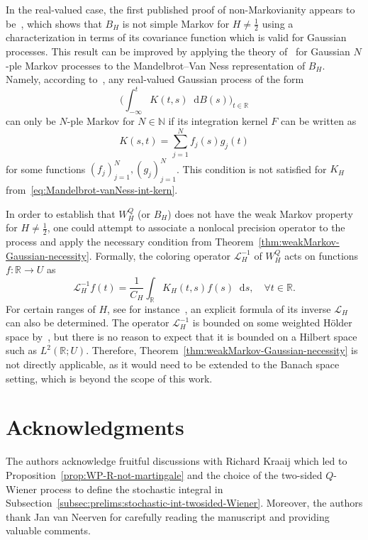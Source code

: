 \documentclass[reqno]{amsart}
\numberwithin{equation}{section}
\newcommand{\bbN}{\mathbb{N}}
\newcommand{\bbR}{\mathbb{R}}
\newcommand{\cL}{\mathcal{L}}
\newcommand{\rd}{\mathop{}\!\mathrm{d}}
\newcommand{\from}{\colon}
\theoremstyle{remark}
\theoremstyle{definition}
\begin{document}
In the real-valued case, the first published proof of non-Markovianity 
appears to be~\cite{Huy2003}, which shows that $B_H$ is not simple Markov for $H \neq \frac{1}{2}$
using a characterization 
in terms of its covariance function which is valid for Gaussian processes.
This result can be improved by applying the theory of~\cite[Chapter~V]{HidaHitsuda1993} for Gaussian $N$-ple Markov processes
to the Mandelbrot--Van Ness representation of $B_H$. Namely,
according to~\cite[Theorem~5.1]{HidaHitsuda1993},
any real-valued Gaussian process of the form 
%
\[
\biggl(\int_{-\infty}^t K(t,s) \rd B(s)\biggr)_{t\in\bbR}
\]
%
can only be $N$-ple Markov for $N \in \bbN$ if its integration kernel $F$ can
be written as
%
\[
K(s,t) = \sum_{j=1}^N f_j(s) g_j(t)
\]
%
for some functions $(f_j)_{j=1}^N, (g_j)_{j=1}^N$. This condition is not
satisfied for $K_H$ from~\eqref{eq:Mandelbrot-vanNess-int-kern}.

In order to establish that $W^Q_H$ (or $B_H$)
does not have the weak Markov property for $H \neq \frac{1}{2}$, 
one could attempt to associate a
nonlocal precision operator to the process and apply the necessary condition
from Theorem~\ref{thm:weakMarkov-Gaussian-necessity}.
Formally, the coloring operator $\cL^{-1}_H$ 
of $W^Q_H$ acts on functions $f \from \bbR \to U$ as
%
\[
\cL^{-1}_H f(t) 
=
\frac{1}{C_H}
\int_\bbR K_H(t,s) f(s) \rd s,
\quad 
\forall t \in \bbR.
\]
%
For certain ranges of $H$, see for instance~\cite[Equation~(31)]{Picard2011}, 
an explicit formula of
its inverse $\cL_H$ can also be determined.
The operator
$\cL^{-1}_H$ is bounded on some
weighted H\"older space by~\cite[Theorem~6]{Picard2011},
but there is no reason to expect that it is bounded on
a Hilbert space such as $L^2(\bbR; U)$. Therefore, 
Theorem~\ref{thm:weakMarkov-Gaussian-necessity} is not directly applicable, as
it
would need to be extended to the Banach space setting, 
which is beyond the scope of this work.

\section*{Acknowledgments}
The authors acknowledge
fruitful discussions with Richard Kraaij which led to
Proposition~\ref{prop:WP-R-not-martingale}
and the choice of the two-sided $Q$-Wiener process 
to define the stochastic integral in Subsection~\ref{subsec:prelims:stochastic-int-twosided-Wiener}.
Moreover, the authors thank Jan van Neerven for
carefully reading the manuscript and 
providing valuable comments. 
\end{document}
